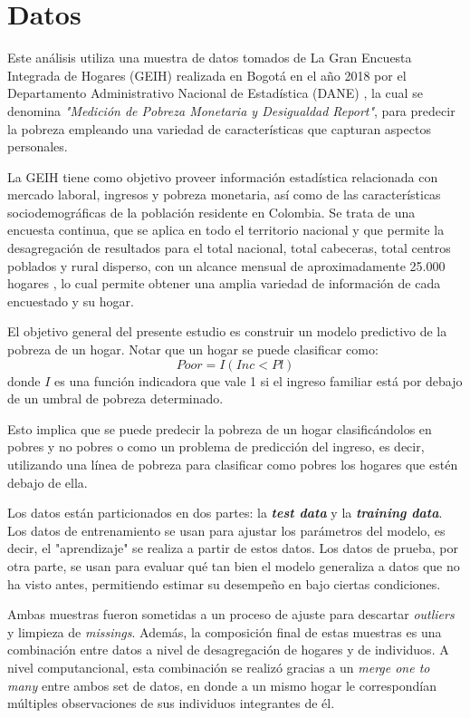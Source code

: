 \documentclass[11pt, a4paper]{article}
\begin{document}
\section{Datos}

Este análisis utiliza una muestra de datos tomados de La Gran Encuesta Integrada de Hogares (GEIH)  realizada en Bogotá en el año 2018 por el Departamento Administrativo Nacional de Estadística (DANE) , la cual se denomina \textit{"Medición de Pobreza Monetaria y Desigualdad Report"}, para predecir la pobreza empleando una variedad de características que capturan aspectos personales. 

La GEIH tiene como objetivo proveer información estadística relacionada con mercado laboral, ingresos y pobreza monetaria, así como de las características sociodemográficas de la población residente en Colombia.  Se trata de una encuesta continua, que se aplica en todo el territorio nacional y que permite la desagregación de resultados para el total nacional, total cabeceras, total centros poblados y rural disperso, con un alcance mensual de aproximadamente 25.000 hogares , lo cual permite obtener una amplia variedad de información de cada encuestado y su hogar.  

El objetivo general del presente estudio es construir un modelo predictivo de la pobreza de un hogar. Notar que un hogar se puede clasificar como: 
\begin{equation*}
Poor = I(Inc<Pl)
\end{equation*}
donde $I$ es una función indicadora que vale 1 si el ingreso familiar está por debajo de un umbral de pobreza determinado.

Esto implica que se puede predecir la pobreza de un hogar clasificándolos en pobres y no pobres o como un problema de predicción del ingreso, es decir, utilizando una línea de pobreza para clasificar como pobres los hogares que estén debajo de ella. 

Los datos están particionados en dos partes: la \textbf{\textit{test data}} y la \textbf{\textit{training data}}. Los datos de entrenamiento se usan para ajustar los parámetros del modelo, es decir, el "aprendizaje" se realiza a partir de estos datos. Los datos de prueba, por otra parte, se usan para evaluar qué tan bien el modelo generaliza a datos que no ha visto antes, permitiendo estimar su desempeño en bajo ciertas condiciones.

Ambas muestras fueron sometidas a un proceso de ajuste para descartar \textit{outliers} y limpieza de \textit{missings}. Además, la composición final de estas muestras es una combinación entre datos a nivel de desagregación de hogares y de individuos. A nivel computancional, esta combinación se realizó gracias a un \textit{merge one to many} entre ambos set de datos, en donde a un mismo hogar le correspondían múltiples observaciones de sus individuos integrantes de él. 
\end{document}
